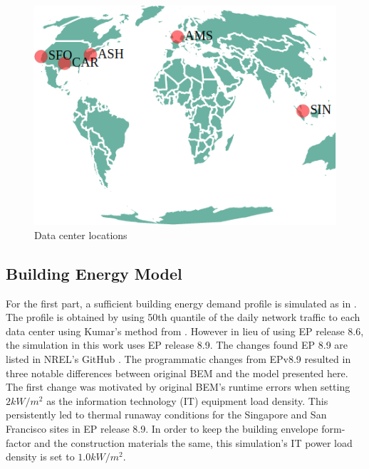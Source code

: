 \begin{figure}
  \centering
  \includegraphics[scale=.40]{marginal_energy_cost/img/dc_locations.png}
  \caption{Data center locations}
  \label{fig:dc_locations}
  \end{figure}


\subsection{Building Energy Model }
For the first part, a sufficient building energy demand profile is simulated as in \cite{kumar20}.  The profile is obtained by using 50th quantile of the daily network traffic to each data center using Kumar’s method from \cite{kumar20b}.  However in lieu of using EP release 8.6, the simulation in this work uses EP release 8.9. The changes found EP 8.9 are listed in NREL’s GitHub \cite{nrel_git}. The programmatic changes from EPv8.9 resulted in three notable differences between original BEM and the model presented here.  The first change was motivated by original BEM's runtime errors when setting $2kW/m^2$ as the information technology (IT) equipment load density. This persistently led to thermal runaway conditions for the Singapore and San Francisco sites in EP release 8.9. In order to keep the building envelope form-factor and the construction materials the same, this simulation’s IT power load density is set to $1.0kW/m^2$.

